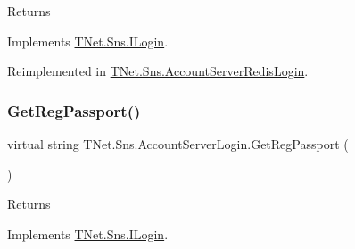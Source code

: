 \begin{DoxyReturn}{Returns}

\end{DoxyReturn}


Implements \mbox{\hyperlink{interface_t_net_1_1_sns_1_1_i_login_a55b0a846946c8ea19a120d8fdb2d7b86}{T\+Net.\+Sns.\+I\+Login}}.



Reimplemented in \mbox{\hyperlink{class_t_net_1_1_sns_1_1_account_server_redis_login_a717e47c6c6203a793613cf8646701168}{T\+Net.\+Sns.\+Account\+Server\+Redis\+Login}}.

\mbox{\label{class_t_net_1_1_sns_1_1_account_server_login_afb41f63a3d82a333820da668c2eaf289}} 
\subsubsection{\texorpdfstring{Get\+Reg\+Passport()}{GetRegPassport()}}
{\footnotesize\ttfamily virtual string T\+Net.\+Sns.\+Account\+Server\+Login.\+Get\+Reg\+Passport (\begin{DoxyParamCaption}{ }\end{DoxyParamCaption})\hspace{0.3cm}{\ttfamily [virtual]}}





\begin{DoxyReturn}{Returns}

\end{DoxyReturn}


Implements \mbox{\hyperlink{interface_t_net_1_1_sns_1_1_i_login_a74bd2db9f18c212d23fa01462bb0a845}{T\+Net.\+Sns.\+I\+Login}}.

\mbox{\label{class_t_net_1_1_sns_1_1_account_server_login_a8d6065c485a91329e271418edc675ae0}} 
